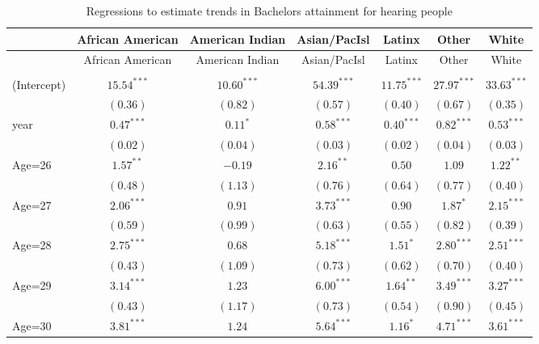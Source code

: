 \documentclass[fullpage]{paper}
\begin{document}
\begin{center}
\begin{longtable}{l c c c c c c }
\hline
 & African American & American Indian & Asian/PacIsl & Latinx & Other & White \\
\hline
\endfirsthead
\hline
 & African American & American Indian & Asian/PacIsl & Latinx & Other & White \\
\hline
\endhead
\hline
\endfoot
\hline
\multicolumn{7}{l}{\scriptsize{$^{***}p<0.001$, $^{**}p<0.01$, $^*p<0.05$}}\\
\caption{Regressions to estimate trends in Bachelors attainment for hearing people}
\label{table:coefficients}
\endlastfoot
(Intercept) & $15.54^{***}$ & $10.60^{***}$ & $54.39^{***}$  & $11.75^{***}$ & $27.97^{***}$ & $33.63^{***}$ \\
            & $(0.36)$      & $(0.82)$      & $(0.57)$       & $(0.40)$      & $(0.67)$      & $(0.35)$      \\
year        & $0.47^{***}$  & $0.11^{*}$    & $0.58^{***}$   & $0.40^{***}$  & $0.82^{***}$  & $0.53^{***}$  \\
            & $(0.02)$      & $(0.04)$      & $(0.03)$       & $(0.02)$      & $(0.04)$      & $(0.03)$      \\
Age=26      & $1.57^{**}$   & $-0.19$       & $2.16^{**}$    & $0.50$        & $1.09$        & $1.22^{**}$   \\
            & $(0.48)$      & $(1.13)$      & $(0.76)$       & $(0.64)$      & $(0.77)$      & $(0.40)$      \\
Age=27      & $2.06^{***}$  & $0.91$        & $3.73^{***}$   & $0.90$        & $1.87^{*}$    & $2.15^{***}$  \\
            & $(0.59)$      & $(0.99)$      & $(0.63)$       & $(0.55)$      & $(0.82)$      & $(0.39)$      \\
Age=28      & $2.75^{***}$  & $0.68$        & $5.18^{***}$   & $1.51^{*}$    & $2.80^{***}$  & $2.51^{***}$  \\
            & $(0.43)$      & $(1.09)$      & $(0.73)$       & $(0.62)$      & $(0.70)$      & $(0.40)$      \\
Age=29      & $3.14^{***}$  & $1.23$        & $6.00^{***}$   & $1.64^{**}$   & $3.49^{***}$  & $3.27^{***}$  \\
            & $(0.43)$      & $(1.17)$      & $(0.73)$       & $(0.54)$      & $(0.90)$      & $(0.45)$      \\
Age=30      & $3.81^{***}$  & $1.24$        & $5.64^{***}$   & $1.16^{*}$    & $4.71^{***}$  & $3.61^{***}$  \\

\end{longtable}
\end{center}
\end{document}
